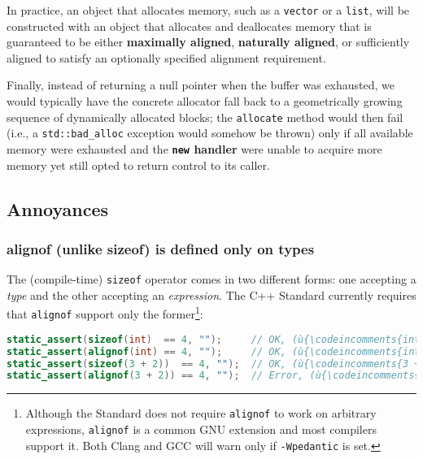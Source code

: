 \noindent In practice, an object that allocates memory, such as a \texttt{vector}
or a \texttt{list}, will be constructed with an object that allocates and
deallocates memory that is guaranteed to be either \textbf{maximally
aligned}, \textbf{naturally aligned}, or sufficiently aligned to satisfy
an optionally specified alignment requirement.

Finally, instead of returning a null pointer when the buffer was
exhausted, we would typically have the concrete allocator fall back to a
geometrically growing sequence of dynamically allocated blocks; the
\texttt{allocate} method would then fail (i.e., a
\texttt{std::bad\_alloc} exception would somehow be thrown) only if all
available memory were exhausted and the \textbf{\texttt{new} handler}
were unable to acquire more memory yet still opted to return control
to its caller.

\subsection[Annoyances]{Annoyances}\label{annoyances-alignof}

\subsubsection[\tt{alignof} (unlike \tt{sizeof}) is defined only on types]{{\SubsubsecCode alignof} (unlike {\SubsubsecCode sizeof}) is defined only on types}\label{alignof-(unlike-sizeof)-is-defined-only-on-types}

The (compile-time) \texttt{sizeof} operator comes in two different
forms: one accepting a \emph{type} and the other accepting an
\emph{expression}. The C++ Standard currently requires that
\texttt{alignof} support only the former{\cprotect\footnote{Although
the Standard does not require \texttt{alignof} to work on arbitrary
expressions, \texttt{alignof} is a common GNU extension and most compilers support
  it. Both Clang and GCC will warn only if \texttt{-Wpedantic} is set.}}:

\begin{lstlisting}[language=C++]
static_assert(sizeof(int)  == 4, "");     // OK, (ù{\codeincomments{int}}ù) is a type.
static_assert(alignof(int) == 4, "");     // OK, (ù{\codeincomments{int}}ù) is a type.
static_assert(sizeof(3 + 2))  == 4, "");  // OK, (ù{\codeincomments{3 + 2}}ù) is an expression.
static_assert(alignof(3 + 2)) == 4, "");  // Error, (ù{\codeincomments{3 + 2}}ù) is not a type.
\end{lstlisting}

